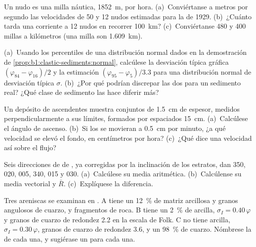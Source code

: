 \begin{exercise}[$\star$]\label{exo:b1:clastic-sediments:4}
Un nudo es una milla náutica, \qty{1852}{m}, por hora. (a)~Conviértanse a metros por segundo las velocidades de 50 y 12 nudos estimadas para la  de
1929. (b)~¿Cuánto tarda una corriente a 12 nudos en recorrer \qty{100}{km}? (c)~Conviértanse 480 y 400 millas a kilómetros (una milla son \qty{1.609}{km}).
\end{exercise}

\begin{exercise}[$\star\star$]\label{exo:b1:clastic-sediments:5}
(a)~Usando los percentiles de una distribución normal dados en la demostración de \cref{prop:b1:clastic-sediments:normal}, calcúlese la desviación típica gráfica
$(\varphi_{84} - \varphi_{16})/2$ y la estimación $(\varphi_{95} - \varphi_5)/3.3$ para una distribución normal de desviación típica $\sigma$. (b)~¿Por qué podrían discrepar
las dos para un sedimento real? ¿Qué clase de sedimento las hace diferir más?
\end{exercise}

\begin{exercise}[$\star\star$]\label{exo:b1:clastic-sediments:6}
Un depósito de  ascendentes muestra conjuntos de \qty{1.5}{cm} de espesor, medidos perpendicularmente a sus límites, formados por  espaciados \qty{15}{cm}. (a)~Calcúlese el
ángulo de ascenso. (b)~Si los  se movieran a \qty{0.5}{cm} por minuto, ¿a qué velocidad se elevó el fondo, en centímetros por hora? (c)~¿Qué dice una velocidad así sobre el flujo?
\end{exercise}

\begin{exercise}[$\star\star$]\label{exo:b1:clastic-sediments:7}
Seis direcciones de  de , ya corregidas por la inclinación de los estratos, dan 350, 020, 005, 340, 015 y 030. (a)~Calcúlese su media aritmética.
(b)~Calcúlense su media vectorial y $\bar R$. (c)~Explíquese la diferencia.
\end{exercise}

\begin{exercise}[$\star\star$]\label{exo:b1:clastic-sediments:8}
Tres areniscas se examinan en . A tiene un \qty{12}{\percent} de matriz arcillosa y granos angulosos de cuarzo,  y fragmentos de roca. B tiene un
\qty{2}{\percent} de arcilla, $\sigma_I = 0.40\,\varphi$ y granos de cuarzo de redondez \num{2.2} en la escala de Folk. C no tiene arcilla, $\sigma_I =
0.30\,\varphi$, granos de cuarzo de redondez \num{3.6}, y un \qty{98}{\percent} de cuarzo. Nómbrese la  de cada una, y sugiérase un  para cada una.
\end{exercise}


